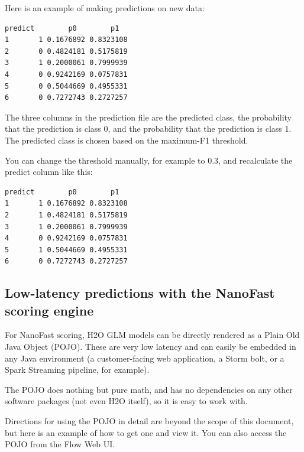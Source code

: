 Here is an example of making predictions on new data:


\begin{lstlisting}[style=output]
  predict        p0        p1
1       1 0.1676892 0.8323108
2       0 0.4824181 0.5175819
3       1 0.2000061 0.7999939
4       0 0.9242169 0.0757831
5       0 0.5044669 0.4955331
6       0 0.7272743 0.2727257
\end{lstlisting}

The three columns in the prediction file are the predicted class, the probability that the prediction is class 0,
and the probability that the prediction is class 1. The predicted class is chosen based on the maximum-F1 threshold.

You can change the threshold manually, for example to 0.3, and recalculate the predict column like this:


\begin{lstlisting}[style=output]
  predict        p0        p1
1       1 0.1676892 0.8323108
2       1 0.4824181 0.5175819
3       1 0.2000061 0.7999939
4       0 0.9242169 0.0757831
5       1 0.5044669 0.4955331
6       0 0.7272743 0.2727257
\end{lstlisting}

\subsection{Low-latency predictions with the NanoFast scoring engine}

For NanoFast scoring, H2O GLM models can be directly rendered as a Plain Old Java Object (POJO).  These are very
low latency and can easily be embedded in any Java environment (a customer-facing web application, a Storm bolt,
or a Spark Streaming pipeline, for example).

The POJO does nothing but pure math, and has no dependencies on any other software packages (not even H2O itself),
so it is easy to work with.

Directions for using the POJO in detail are beyond the scope of this document, but here is an example of how to get
one and view it.  You can also access the POJO from the Flow Web UI.

\bigskip
\waterExampleInR




